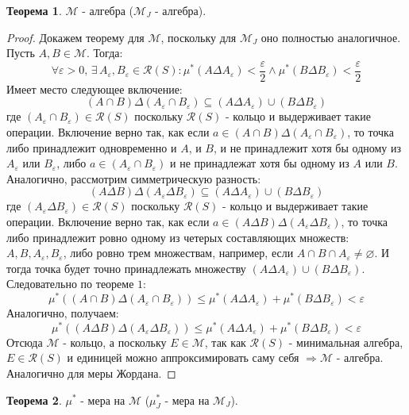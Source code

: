 \documentclass[12pt]{article}
\newcommand{\MCR}{\mathcal{R}}
\newcommand{\MM}{\mathcal{M}}
\newcommand{\VN}{\varnothing}
\newcommand{\VE}{\varepsilon}
\theoremstyle{definition}
\newtheorem{theorem}{Теорема}
\begin{document}
\begin{theorem}
	$\MM$ - алгебра ($\MM_J$ - алгебра).
\end{theorem}
\begin{proof}
	Докажем теорему для $\MM$, поскольку для $\MM_J$ оно полностью аналогичное. Пусть $A,B \in \MM$. Тогда:
	$$
		\forall \VE > 0,\,\exists \, A_\VE, B_\VE \in \MCR(S) \colon \mu^*(A \Delta A_\VE) < \dfrac{\VE}{2} \wedge \mu^*(B \Delta B_\VE) < \dfrac{\VE}{2}
	$$
	Имеет место следующее включение: 
	$$
		(A \cap B) \Delta (A_\VE \cap B_\VE) \subseteq (A \Delta A_\VE) \cup (B \Delta B_\VE	)
	$$
	где $(A_\VE \cap B_\VE) \in \MCR(S)$ поскольку $\MCR(S)$ - кольцо и выдерживает такие операции. Включение верно так, как если $a \in (A \cap B) \Delta (A_\VE \cap B_\VE)$, то точка либо принадлежит одновременно и $A$, и $B$, и не принадлежит хотя бы одному из $A_\VE$ или $B_\VE$, либо $a \in (A_\VE \cap B_\VE)$ и не принадлежат хотя бы одному из $A$ или $B$. Аналогично, рассмотрим симметрическую разность:
	$$
		(A \Delta B) \Delta (A_\VE \Delta B_\VE) \subseteq (A \Delta A_\VE) \cup (B \Delta B_\VE	)
	$$
	где $(A_\VE \Delta B_\VE) \in \MCR(S)$ поскольку $\MCR(S)$ - кольцо и выдерживает такие операции. Включение верно так, как если $a \in (A \Delta B) \Delta (A_\VE \Delta B_\VE)$, то точка либо принадлежит ровно одному из четерых составляющих множеств: $A, B, A_\VE, B_\VE$, либо ровно трем множествам, например, если $A \cap B \cap A_\VE \neq \VN$. И тогда точка будет точно принадлежать множеству $(A \Delta A_\VE) \cup (B \Delta B_\VE)$. Следовательно по теореме $1$:
	$$
		\mu^*((A \cap B) \Delta (A_\VE \cap B_\VE)) \leq \mu^*(A \Delta A_\VE ) + \mu^*(B \Delta B_\VE) < \VE
	$$
	Аналогично, получаем:
	$$
		\mu^*((A \Delta B) \Delta (A_\VE \Delta B_\VE)) \leq \mu^*(A \Delta A_\VE ) + \mu^*(B \Delta B_\VE) < \VE
	$$
	Отсюда $\MM$ - кольцо, а поскольку $E \in \MM$, так как $\MCR(S)$ - минимальная алгебра, $E \in \MCR(S)$ и единицей можно аппроксимировать саму себя $\Rightarrow \MM$ - алгебра. Аналогично для меры Жордана.
\end{proof}
\begin{theorem}
	$\mu^*$ - мера на $\MM$ ($\mu^*_J$ - мера на $\MM_J$).
\end{theorem}
\end{document}
